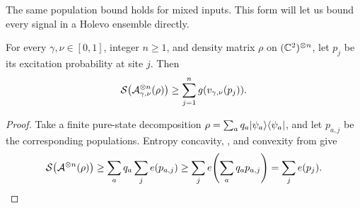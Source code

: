 The same population bound holds for mixed inputs. This form will let us
bound every signal in a Holevo ensemble directly.

\begin{corollary}\label{cor:mixed-bound}
For every $\gamma,\nu\in[0,1]$, integer $n\ge1$, and density matrix
$\rho$ on $(\mathbb C^2)^{\otimes n}$, let $p_j$ be its excitation
probability at site $j$. Then
\[
 \mathcal S\bigl(\mathcal A_{\gamma,\nu}^{\otimes n}(\rho)\bigr)
 \ge\sum_{j=1}^n g(v_{\gamma,\nu}(p_j)).
\]
\end{corollary}
\begin{proof}
Take a finite pure-state decomposition $\rho=\sum_aq_a\lvert \psi_a\rangle\langle \psi_a\rvert$,
and let $p_{a,j}$ be the corresponding populations. Entropy concavity,
, and convexity from  give
\[
 \mathcal S\bigl(\mathcal A^{\otimes n}(\rho)\bigr)
 \ge\sum_aq_a\sum_j e(p_{a,j})
 \ge\sum_j e\!\left(\sum_aq_ap_{a,j}\right)=\sum_j e(p_j).
\]
\end{proof}
